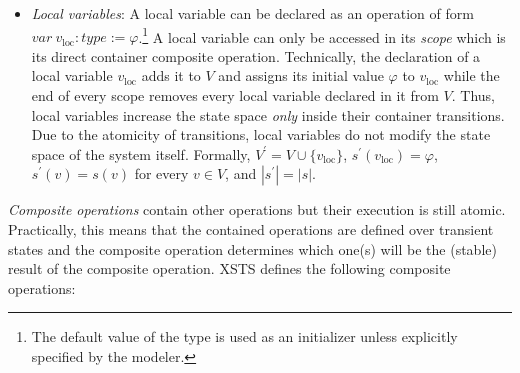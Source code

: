 \begin{itemize}
        \item \textit{Local variables}: A local variable can be declared as an operation of form $\mathit{var}\ v_{\mathit{\mathrm{loc}}} : \mathit{type} :=\varphi$.\footnote{The default value of the type is used as an initializer unless explicitly specified by the modeler.} A local variable can only be accessed in its \textit{scope} which is its direct container composite operation. Technically, the declaration of a local variable $v_{\mathrm{loc}}$ adds it to $V$ and assigns its initial value $\varphi$ to $v_{\mathrm{loc}}$ while the end of every scope removes every local variable declared in it from $V$. Thus, local variables increase the state space \textit{only} inside their container transitions. Due to the atomicity of transitions, local variables do not modify the state space of the system itself. Formally, $V^\prime = V \cup \{ v_{\mathrm{loc}} \}$, $s^\prime(v_{\mathrm{loc}}) = \varphi$, $s^\prime(v) = s(v)$ for every $v \in V$, and $|s^\prime| = |s|$.
    \end{itemize}
\emph{Composite operations} contain other operations but their execution is still atomic. Practically, this means that the contained operations are defined over transient states and the composite operation determines which one(s) will be the (stable) result of the composite operation. XSTS defines the following composite operations:

